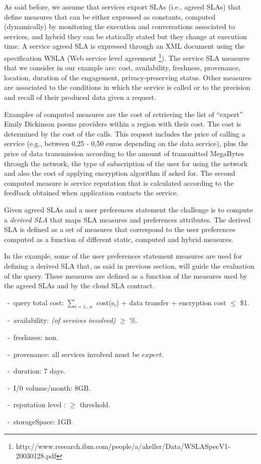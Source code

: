 As said before, we assume that services export SLAs (i.e., agreed SLAs) that define measures   that can be either expressed as constants,  computed (dynamically) by monitoring the execution and conversations associated to services, and hybrid they can be statically stated  but they change at execution time.  A service  agreed SLA is expressed through an  XML document using the specification WSLA (Web service level agreement \footnote{\footnotesize http://www.research.ibm.com/people/a/akeller/\-Data/WSLASpecV1-20030128.pdf}). The service SLA measures  that we consider in our example are: cost, availability, freshness, provenance, location, duration of the engagement, privacy-preserving status. Other measures are associated to the conditions in which the service is called or to the precision and recall of their produced data given a request. 

Examples of computed measures are the cost of retrieving the list of ``expert'' Emily Dickinson poems providers within a region with their cost. 
The cost is determined by the  cost of the calls. 
This request  includes the price of calling a service (e.g.,  between 0,25 - 0,50 euros depending on the data service), plus the price of data transmission according to the amount of transmitted MegaBytes through the network, the type of subscription of the user for using the network and also the cost of applying encryption algorithm if asked for. The second computed measure is service reputation that is calculated according to the feedback obtained when application contacts the service.

Given agreed SLAs and a user preferences statement the challenge is to compute a  {\em derived SLA} that  maps SLA measures and preferences attributes.  
The derived SLA is defined as a set of measures that correspond to the user preferences computed as a function of different static, computed and hybrid measures. 

In the example, some of the user preferences statement measures are used for defining a derived SLA that, as said in previous section, will guide the evaluation of the query. 
These measures are defined as a function of the measures used by the agreed SLAs and by the cloud SLA contract.
\begin{trivlist}\sf\footnotesize
 \item[~-~query total cost:] $\sum_{i = 1\dots n}$ cost(s$_i$) + data transfer + encryption cost $\leq$ \$1.
 \item[~-~availability:] {\em (of services involved)} $\geq$ {$\%$}.
 \item[~-~freshness:] non.
 \item[~-~provenance:] all services involved must be $expert$.
 \item[~-~duration:] 7 days.
 \item[~-~I/0 volume/month:] 8GB.
 \item[~-~reputation level :] $\geq$ threshold.
 \item[~-~storageSpace:] 1GB.
 \end{trivlist} 
 
